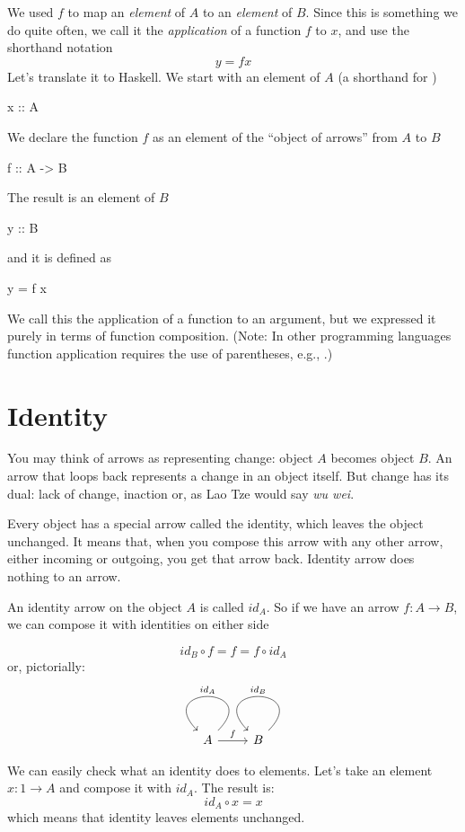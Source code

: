 \documentclass[DaoFP]{subfiles}
\begin{document}
We used $f$ to map an \emph{element} of $A$ to an \emph{element} of $B$. Since this is something we do quite often, we call it the \emph{application} of a function $f$ to $x$, and use the shorthand notation
\[y = f x \]
Let's translate it to Haskell. We start with an element of $A$ (a shorthand for )
\begin{haskell}
x :: A
\end{haskell}
We declare the function $f$ as an element of the ``object of arrows'' from $A$ to $B$
\begin{haskell}
f :: A -> B
\end{haskell}
The result is an element of $B$
\begin{haskell}
y :: B
\end{haskell}
and it is defined as
\begin{haskell}
y = f x
\end{haskell}
We call this the application of a function to an argument, but we expressed it purely in terms of function composition. (Note: In other programming languages function application requires the use of parentheses, e.g., .)

\section{Identity}

You may think of arrows as representing change: object $A$ becomes object $B$. An arrow that loops back represents a change in an object itself. But change has its dual: lack of change, inaction or, as Lao Tze would say \emph{wu wei}. 

Every object has a special arrow called the identity, which leaves the object unchanged. It means that, when you compose this arrow with any other arrow, either incoming or outgoing, you get that arrow back. Identity arrow does nothing to an arrow. 

An identity arrow on the object $A$ is called $id_A$. So if we have an arrow $f \colon A \to B$, we can compose it with identities on either side

\[id_B \circ f = f = f \circ id_A \]
or, pictorially:
\[
 \begin{tikzcd}
 A
 \arrow[loop, "id_A"']
 \arrow[r, "f"]
 & B
 \arrow[loop, "id_B"']
 \end{tikzcd}
\]

We can easily check what an identity does to elements. Let's take an element $x \colon 1 \to A$ and compose it with $id_A$. The result is:
\[id_A \circ x = x\]
which means that identity leaves elements unchanged.
\end{document}
